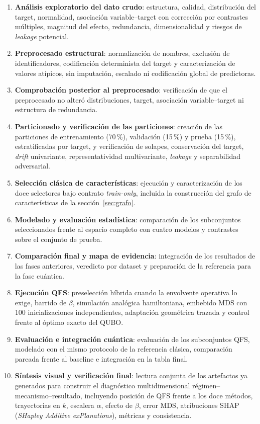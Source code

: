 \begin{enumerate}
\item \textbf{Análisis exploratorio del dato crudo}: estructura,
  calidad, distribución del target, normalidad, asociación
  variable--target con corrección por contrastes múltiples, magnitud
  del efecto, redundancia, dimensionalidad y riesgos de
  \textit{leakage} potencial.
\item \textbf{Preprocesado estructural}: normalización de nombres,
  exclusión de identificadores, codificación determinista del target y
  caracterización de valores atípicos, sin imputación, escalado ni
  codificación global de predictoras.
\item \textbf{Comprobación posterior al preprocesado}: verificación de que el
  preprocesado no alteró distribuciones, target, asociación
  variable--target ni estructura de redundancia.
\item \textbf{Particionado y verificación de las particiones}: creación de las
  particiones de entrenamiento (70\,\%), validación (15\,\%) y prueba
  (15\,\%), estratificadas por target, y verificación de solapes,
  conservación del target, \textit{drift} univariante,
  representatividad multivariante, \textit{leakage} y separabilidad
  adversarial.
\item \textbf{Selección clásica de características}: ejecución y
  caracterización de los doce selectores bajo contrato
  \textit{train-only}, incluida la construcción del grafo de
  características de la sección~\ref{sec:grafo}.
\item \textbf{Modelado y evaluación estadística}: comparación de los
  subconjuntos seleccionados frente al espacio completo con cuatro
  modelos y contrastes sobre el conjunto de prueba.
\item \textbf{Comparación final y mapa de evidencia}: integración de
  los resultados de las fases anteriores, veredicto por dataset y
  preparación de la referencia para la fase cuántica.
\item \textbf{Ejecución QFS}: preselección híbrida cuando la envolvente
  operativa lo exige, barrido de $\beta$, simulación analógica
  hamiltoniana, embebido MDS con 100 inicializaciones
  independientes, adaptación geométrica trazada y control frente al
  óptimo exacto del QUBO.
\item \textbf{Evaluación e integración cuántica}: evaluación de los
  subconjuntos QFS, modelado con el mismo protocolo de la referencia
  clásica, comparación pareada frente al baseline e integración en la
  tabla final.
\item \textbf{Síntesis visual y verificación final}: lectura conjunta de
  los artefactos ya generados para construir el diagnóstico
  multidimensional régimen--mecanismo--resultado, incluyendo posición de
  QFS frente a los doce métodos, trayectorias en $k$, escalera
  $\alpha$, efecto de $\beta$, error MDS, atribuciones SHAP
  (\textit{SHapley Additive exPlanations}), métricas y consistencia.
\end{enumerate}

